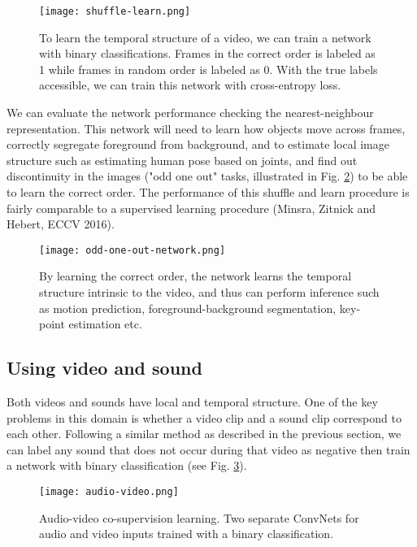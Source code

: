 \begin{figure}[h!]
\begin{center}
  \texttt{[image: shuffle-learn.png]}
    \caption{To learn the temporal structure of a video, we can train a network with binary classifications. 
    Frames in the correct order is labeled as 1 while frames in random order is labeled as 0.
  With the true labels accessible, we can train this network with cross-entropy loss.}
\end{center}
  \label{fig:1}
\end{figure}

We can evaluate the network performance checking the nearest-neighbour representation.
This network will need to learn how objects move across frames, correctly segregate foreground from background, and to estimate local image structure such as estimating human pose based on joints, and find out discontinuity in the images ("odd one out" tasks, illustrated in Fig. \ref{fig:2}) to be able to learn the correct order.
The performance of this shuffle and learn procedure is fairly comparable to a supervised learning procedure (Minsra, Zitnick and Hebert, ECCV 2016). 
\begin{figure}[h!]
\begin{center}
  \texttt{[image: odd-one-out-network.png]}
    \caption{By learning the correct order, the network learns the temporal structure intrinsic to the video, and thus can perform inference such as motion prediction, foreground-background segmentation, key-point estimation etc.}
\end{center}
  \label{fig:2}
\end{figure}


\subsection{Using video and sound}

Both videos and sounds have local and temporal structure. One of the key problems in this domain is whether a video clip and a sound clip correspond to each other. 
Following a similar method as described in the previous section, we can label any sound that does not occur during that video as negative then train a network with binary classification (see Fig. \ref{fig:3}). 

\begin{figure}[h!]
\begin{center}
  \texttt{[image: audio-video.png]}
    \caption{Audio-video co-supervision learning. 
    Two separate ConvNets for audio and video inputs trained with a binary classification.}
\end{center}
  \label{fig:3}
\end{figure}

